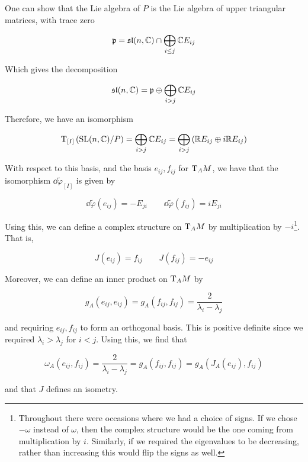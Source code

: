 \documentclass{article}
\renewcommand{\sl}{\mathfrak{sl}}
\renewcommand{\tilde}{\widetilde}
\begin{document}
One can show that the Lie algebra of \(P\) is the Lie algebra of upper triangular matrices, with trace zero

\[\mfp = \sl(n, \C) \cap \bigoplus_{i \le j}\C E_{ij}\]

Which gives the decomposition

\[\sl(n, \C) = \mfp \oplus \bigoplus_{i > j}\C E_{ij}\]

Therefore, we have an isomorphism

\[\mathrm{T}_{[I]}\left(\operatorname{SL}(n, \mathbb{C})/P\right) = \bigoplus_{i > j}\mathbb{C} E_{ij} = \bigoplus_{i > j}\left(\mathbb{R} E_{ij} \oplus i\mathbb{R} E_{ij}\right)\]

With respect to this basis, and the basis \(e_{ij}, f_{ij}\) for \(\mathrm{T}_AM\), we have that the isomorphism \(\dd\tilde\varphi_{[I]}\) is given by

\[\dd\tilde\varphi(e_{ij}) = -E_{ji} \qquad \dd\tilde\varphi(f_{ij}) = iE_{ji}\]

Using this, we can define a complex structure on \(\mathrm{T}_AM\) by multiplication by \(-i\)\footnote{Throughout there were occasions where we had a choice of signs. If we chose \(-\omega\) instead of \(\omega\), then the complex structure would be the one coming from multiplication by \(i\). Similarly, if we required the eigenvalues to be decreasing, rather than increasing this would flip the signs as well.}. That is,

\[J(e_{ij}) = f_{ij} \qquad J(f_{ij}) = -e_{ij}\]




Moreover, we can define an inner product on \(\mathrm{T}_AM\) by

\[g_A(e_{ij}, e_{ij}) = g_A(f_{ij}, f_{ij}) = \frac{2}{\lambda_i - \lambda_j}\]

and requiring \(e_{ij}, f_{ij}\) to form an orthogonal basis. This is positive definite since we required \(\lambda_i > \lambda_j\) for \(i < j\). Using this, we find that

\[\omega_A(e_{ij}, f_{ij}) = \frac{2}{\lambda_i - \lambda_j} = g_A(f_{ij}, f_{ij}) = g_A(J_A(e_{ij}), f_{ij})\]

and that \(J\) defines an isometry.
\end{document}

